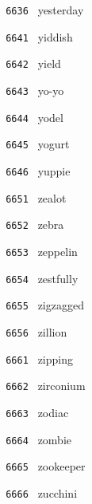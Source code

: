 \documentclass[11pt]{article}
\begin{document}
\begin{multicols}{6}
\noindent \texttt{ 6636 } yesterday  \par
\noindent \texttt{ 6641 } yiddish  \par
\noindent \texttt{ 6642 } yield  \par
\noindent \texttt{ 6643 } yo-yo  \par
\noindent \texttt{ 6644 } yodel  \par
\noindent \texttt{ 6645 } yogurt  \par
\noindent \texttt{ 6646 } yuppie  \par
\noindent \texttt{ 6651 } zealot  \par
\noindent \texttt{ 6652 } zebra  \par
\noindent \texttt{ 6653 } zeppelin  \par
\noindent \texttt{ 6654 } zestfully  \par
\noindent \texttt{ 6655 } zigzagged  \par
\noindent \texttt{ 6656 } zillion  \par
\noindent \texttt{ 6661 } zipping  \par
\noindent \texttt{ 6662 } zirconium  \par
\noindent \texttt{ 6663 } zodiac  \par
\noindent \texttt{ 6664 } zombie  \par
\noindent \texttt{ 6665 } zookeeper  \par
\noindent \texttt{ 6666 } zucchini
\end{multicols}
\end{document}
